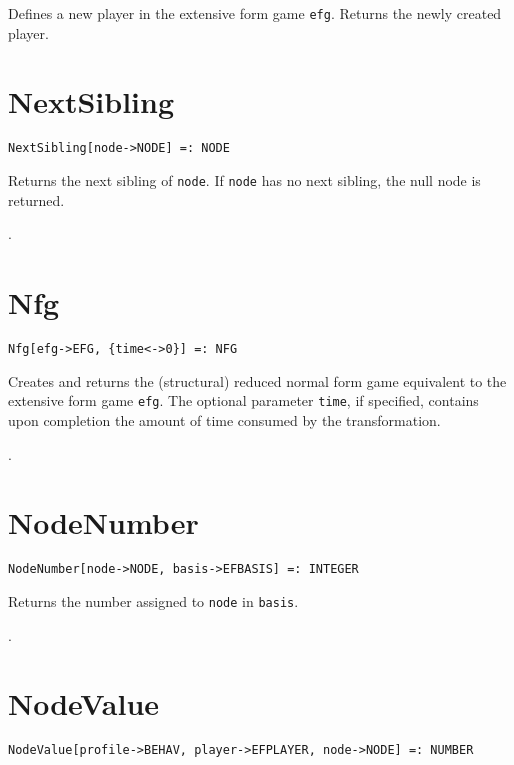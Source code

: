 \noindent
Defines a new player in the extensive form game \verb+efg+.  Returns
the newly created player.  


\section*{NextSibling}\label{PrimNextSibling}
\begin{verbatim}
NextSibling[node->NODE] =: NODE 
\end{verbatim}

\noindent
Returns the next sibling of \verb+node+.  If \verb+node+ has no next
sibling, the null node is returned.

\seealso {}.


\section*{Nfg}\label{PrimNfg}
\begin{verbatim}
Nfg[efg->EFG, {time<->0}] =: NFG 
\end{verbatim}

\noindent
Creates and returns the (structural) reduced normal form game equivalent
to the extensive form game \verb+efg+.  The optional parameter \verb+time+,
if specified, contains upon completion the amount of time consumed by
the transformation.

\seealso {}.


\section*{NodeNumber}\label{PrimNodeNumber}
\begin{verbatim}
NodeNumber[node->NODE, basis->EFBASIS] =: INTEGER 
\end{verbatim}

\noindent
Returns the number assigned to \verb+node+ in \verb+basis+.

\seealso {}.


\section*{NodeValue}\label{PrimNodeValue}
\begin{verbatim}
NodeValue[profile->BEHAV, player->EFPLAYER, node->NODE] =: NUMBER 
\end{verbatim}

